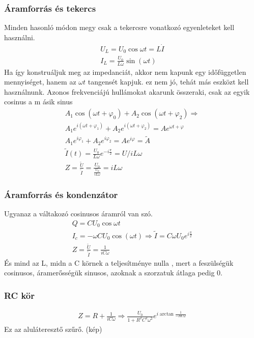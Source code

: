 \documentclass{article}
\begin{document}
\subsubsection{Áramforrás és tekercs}
Minden hasonló módon megy csak a tekercsre vonatkozó egyenleteket kell használni. 
\begin{gather*}
U_L = U_0 \cos{\omega t}  = L\dot{I}\\
I_L = \frac{U_0}{L \omega} \sin(\omega t)
\end{gather*} 
Ha így konstruáljuk meg az impedanciát, akkor nem kapunk egy időfüggetlen mennyiséget, hanem az $\omega t$ tangensét kapjuk. ez nem jó, tehát más eszközt kell használnunk. Azonos frekvenciájú hullámokat akarunk összeraki, csak az egyik cosinus a m ásik sinus
\begin{gather*}
A_1 \cos(\omega t + \varphi_0) + A_2 \cos(\omega t + \varphi_2) \Rightarrow\\
A_1 e^{i(\omega t + \varphi_1)} + A_2 e^{i(\omega t + \varphi_2)} = A e^{\omega t + \varphi}\\ 
A_1 e^{i\varphi_1} + A_2 e^{i\varphi_2} = A e^{i\varphi} = \tilde{A} \\
\tilde{I}(t) = \frac{U_0}{L\omega} e^{-i\frac{\pi}{2}} = U/iL\omega \\
Z = \frac{\tilde{U}}{\tilde{I}} = \frac{U_0}{\frac{U_0}{iL\omega}} = iL\omega
\end{gather*}
\subsubsection{Áramforrás és kondenzátor}
Ugyanaz a váltakozó cosinusos áramról van szó. 
\begin{gather*}
Q=CU_0 \cos{\omega t} \\
I_c = -\omega C U_0 \cos(\omega t) \Rightarrow \tilde{I} = C\omega U_0 e^{i\frac{\pi}{2}} \\
Z=\frac{\tilde{U}}{\tilde{I}} = \frac{1}{iC\omega}
\end{gather*}
És mind az L, midn a C körnek a teljesítménye nulla , mert a feszülségük cosinusos, áramerősségük sinusos, azoknak a szorzatuk átlaga pedig 0.
\subsubsection{RC kör}
\begin{gather*}
Z=R+\frac{1}{iC\omega} \Rightarrow
\frac{U_0}{1+R^2 C^2 \omega^2}e^{i \arctan \frac{1}{-RC\omega}}
\end{gather*}
Ez az aluláteresztő szűrő. (kép) 
\end{document}
